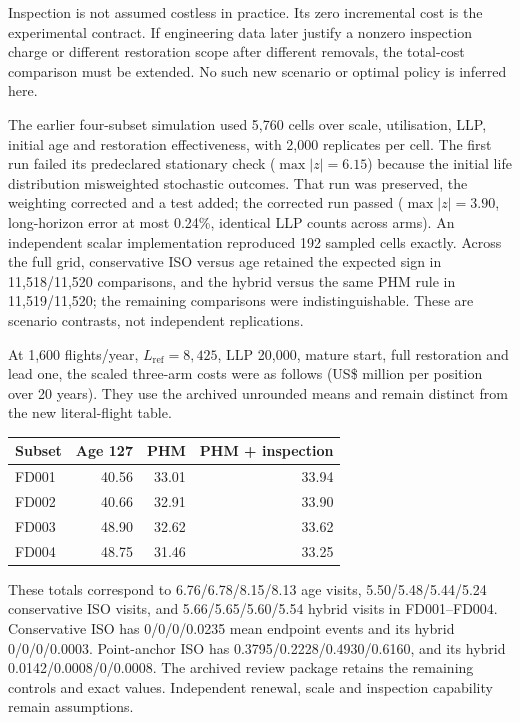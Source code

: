 \documentclass[12pt]{article}
\begin{document}
Inspection is not assumed costless in practice. Its zero incremental cost is the experimental contract. If engineering data later justify a nonzero inspection charge or different restoration scope after different removals, the total-cost comparison must be extended. No such new scenario or optimal policy is inferred here.

The earlier four-subset simulation used 5,760 cells over scale, utilisation, LLP, initial age and restoration effectiveness, with 2,000 replicates per cell. The first run failed its predeclared stationary check ($\max|z|=6.15$) because the initial life distribution misweighted stochastic outcomes. That run was preserved, the weighting corrected and a test added; the corrected run passed ($\max|z|=3.90$, long-horizon error at most 0.24\%, identical LLP counts across arms). An independent scalar implementation reproduced 192 sampled cells exactly. Across the full grid, conservative ISO versus age retained the expected sign in 11,518/11,520 comparisons, and the hybrid versus the same PHM rule in 11,519/11,520; the remaining comparisons were indistinguishable. These are scenario contrasts, not independent replications.

At 1,600 flights/year, $L_{\mathrm{ref}}=8,425$, LLP 20,000, mature start, full restoration and lead one, the scaled three-arm costs were as follows (US\$ million per position over 20 years). They use the archived unrounded means and remain distinct from the new literal-flight table.
\begin{center}
\begin{tabular}{@{}lrrr@{}}
\toprule
Subset & Age 127 & PHM & PHM + inspection \\
\midrule
FD001 & 40.56 & 33.01 & 33.94 \\
FD002 & 40.66 & 32.91 & 33.90 \\
FD003 & 48.90 & 32.62 & 33.62 \\
FD004 & 48.75 & 31.46 & 33.25 \\
\bottomrule
\end{tabular}
\end{center}
These totals correspond to 6.76/6.78/8.15/8.13 age visits, 5.50/5.48/5.44/5.24 conservative ISO visits, and 5.66/5.65/5.60/5.54 hybrid visits in FD001--FD004. Conservative ISO has 0/0/0/0.0235 mean endpoint events and its hybrid 0/0/0/0.0003. Point-anchor ISO has 0.3795/0.2228/0.4930/0.6160, and its hybrid 0.0142/0.0008/0/0.0008. The archived review package retains the remaining controls and exact values. Independent renewal, scale and inspection capability remain assumptions.
\end{document}
